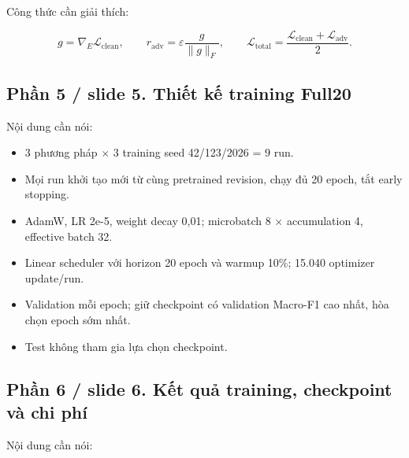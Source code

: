 \documentclass[11pt,a4paper]{article}
\begin{document}
Công thức cần giải thích:


\[
g=\nabla_E\mathcal L_{\mathrm{clean}},\qquad
r_{\mathrm{adv}}=\varepsilon\frac{g}{\lVert g\rVert_F},\qquad
\mathcal L_{\mathrm{total}}=\frac{\mathcal L_{\mathrm{clean}}+\mathcal L_{\mathrm{adv}}}{2}.
\]

\subsection*{Phần 5 / slide 5. Thiết kế training Full20}

Nội dung cần nói:


\begin{itemize}

\item 3 phương pháp \ensuremath{\times} 3 training seed 42/123/2026 = 9 run.

\item Mọi run khởi tạo mới từ cùng pretrained revision, chạy đủ 20 epoch, tắt early stopping.

\item AdamW, LR 2e-5, weight decay 0,01; microbatch 8 \ensuremath{\times} accumulation 4, effective batch 32.

\item Linear scheduler với horizon 20 epoch và warmup 10\%; 15.040 optimizer update/run.

\item Validation mỗi epoch; giữ checkpoint có validation Macro-F1 cao nhất, hòa chọn epoch sớm nhất.

\item Test không tham gia lựa chọn checkpoint.

\end{itemize}

\subsection*{Phần 6 / slide 6. Kết quả training, checkpoint và chi phí}

Nội dung cần nói:
\end{document}
